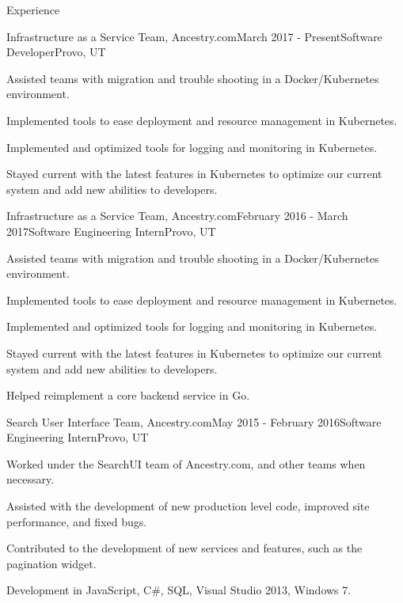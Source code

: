 \documentclass{resume} %
\begin{document}
\begin{rSection}{Experience}

\begin{rSubsection}{Infrastructure as a Service Team, Ancestry.com}{March 2017 - Present}{Software Developer}{Provo, UT}
\item Assisted teams with migration and trouble shooting in a Docker/Kubernetes environment.
\item Implemented tools to ease deployment and resource management in Kubernetes.
\item Implemented and optimized tools for logging and monitoring in Kubernetes.
\item Stayed current with the latest features in Kubernetes to optimize our current system and add new abilities to developers. 
\end{rSubsection}
  
\begin{rSubsection}{Infrastructure as a Service Team, Ancestry.com}{February 2016 - March 2017}{Software Engineering Intern}{Provo, UT}
\item Assisted teams with migration and trouble shooting in a Docker/Kubernetes environment.
\item Implemented tools to ease deployment and resource management in Kubernetes.
\item Implemented and optimized tools for logging and monitoring in Kubernetes.
\item Stayed current with the latest features in Kubernetes to optimize our current system and add new abilities to developers.
\item Helped reimplement a core backend service in Go.
\end{rSubsection}

\begin{rSubsection}{Search User Interface Team, Ancestry.com}{May 2015 - February 2016}{Software Engineering Intern}{Provo, UT}
	\item Worked under the SearchUI team of Ancestry.com, and other teams when necessary.
	\item Assisted with the development of new production level code, improved site performance, and fixed bugs.
	\item Contributed to the development of new services and features, such as the pagination widget.
	\item Development in JavaScript, C\#, SQL, Visual Studio 2013, Windows 7.
\end{rSubsection}


\end{rSection}
\end{document}
